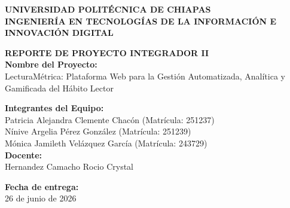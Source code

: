 \documentclass[12pt, atypical, journal]{article}
\begin{document}
\begin{titlepage}
   \begin{center}
       \vspace*{1cm}
      
       {\Large\bfseries UNIVERSIDAD POLITÉCNICA DE CHIAPAS} \\[0.5cm]
       {\large\bfseries INGENIERÍA EN TECNOLOGÍAS DE LA INFORMACIÓN E INNOVACIÓN DIGITAL} \\[1.5cm]
      
       \vfill
      
       {\Large\bfseries REPORTE DE PROYECTO INTEGRADOR II} \\[1cm]
      
       \textbf{Nombre del Proyecto:} \\
       {\large LecturaMétrica: Plataforma Web para la Gestión Automatizada, Analítica y Gamificada del Hábito Lector} \\[1.5cm]
      
       \vfill
      
       \textbf{Integrantes del Equipo:} \\[0.3cm]
       {\large Patricia Alejandra Clemente Chacón (Matrícula: 251237)} \\
       {\large Nínive Argelia Pérez González (Matrícula: 251239)} \\
       {\large Mónica Jamileth Velázquez García (Matrícula: 243729)} \\[1.5cm]
      
       \textbf{Docente:} \\
       {\large Hernandez Camacho Rocio Crystal} \\[1.5cm]
      
       \vfill
      
       \textbf{Fecha de entrega:} \\
       {\large 26 de junio de 2026}
      
       \vspace*{1cm}
   \end{center}
\end{titlepage}

\newpage

\tableofcontents
\newpage
\end{document}
